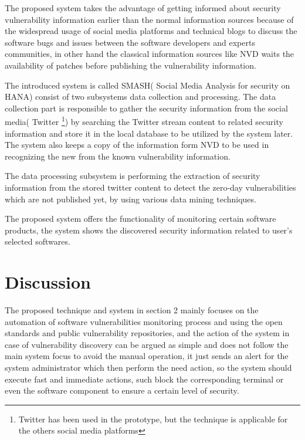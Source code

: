 \documentclass{llncs}
\begin{document}
The proposed system takes the advantage of getting informed about security vulnerability information earlier than the normal information sources because of the widespread usage of social media platforms and technical blogs to discuss the software bugs and issues between the software developers and experts communities, in other hand the classical information sources like NVD waits the availability of patches before publishing the vulnerability information.
\par The introduced system is called SMASH( Social Media Analysis for security on HANA) consist of two subsystems data collection and processing. The data collection part is responsible to gather the security information from the social media( Twitter \footnote{Twitter has been used in the prototype, but the technique is applicable for the others social media platforms}) by searching the Twitter stream content to related security information and store it in the local database to be utilized by the system later. The system also keeps a copy of the information form NVD to be used in recognizing the new from the known vulnerability information.
\par
The data processing subsystem is performing the extraction of security information from the stored twitter content to detect the zero-day vulnerabilities which are not published yet, by using various data mining techniques.

The proposed system offers the functionality of monitoring certain software products, the system shows the discovered security information related to user's selected softwares.
  

\newpage
\section{Discussion}

\par The proposed technique and system in section 2 mainly focuses on the automation of software vulnerabilities monitoring process and using the open standards and public vulnerability repositories, and the action of the system in case of vulnerability  discovery can be argued as simple and does not follow the main system focus to avoid the manual operation, it just sends an alert for the system administrator which then perform the need action, so the system should execute fast and immediate actions, such block the corresponding terminal or even the software component to ensure a certain level of security. 
\end{document}
